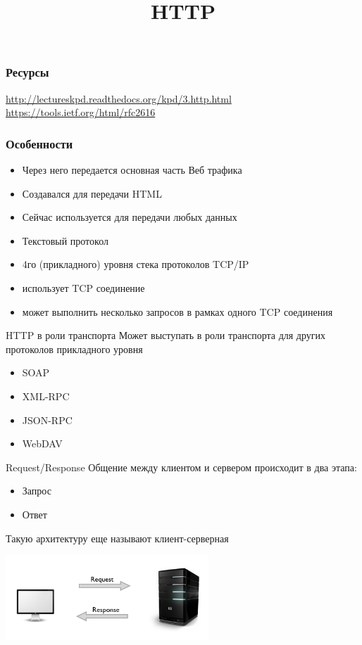 

\title{HTTP}



\frame{\titlepage}

\begin{frame}
    \frametitle{Ресурсы}
    \url{http://lectureskpd.readthedocs.org/kpd/3.http.html}
    \url{https://tools.ietf.org/html/rfc2616}
\end{frame}

\begin{frame}
    \frametitle{Особенности}
    \begin{itemize}
        \item Через него передается основная часть Веб трафика
        \item Создавался для передачи HTML
        \item Сейчас используется для передачи любых данных
        \item Текстовый протокол
        \item 4го (прикладного) уровня стека протоколов TCP/IP
        \item использует TCP соединение
        \item может выполнить несколько запросов в рамках одного TCP соединения
    \end{itemize}
\end{frame}

\begin{frame}{HTTP в роли транспорта}
    Может выступать в роли транспорта для других протоколов прикладного уровня
    \begin{itemize}
        \item SOAP
        \item XML-RPC
        \item JSON-RPC
        \item WebDAV
    \end{itemize}
\end{frame}

\begin{frame}{Request/Response}
    Общение между клиентом и сервером происходит в два этапа:
    \begin{itemize}
        \item Запрос
        \item Ответ
    \end{itemize}
    Такую архитектуру еще называют клиент-серверная
    \begin{center}
        \includegraphics[width=3in]{media/client-server.png}
    \end{center}
\end{frame}

